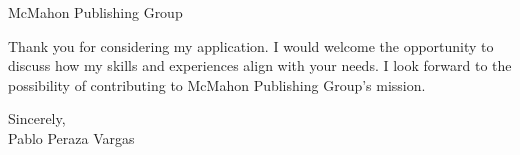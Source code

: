 \documentclass[10.5pt]{letter}
\newcommand{\companyName}{McMahon Publishing Group}
\begin{document}
\begin{letter}{
    \companyName
}
\par
Thank you for considering my application. I would welcome the opportunity to discuss how my skills and experiences align with your needs. I look forward to the possibility of contributing to \companyName{}'s mission.

\closing{Sincerely, \\ Pablo Peraza Vargas}


\end{letter}
\end{document}
